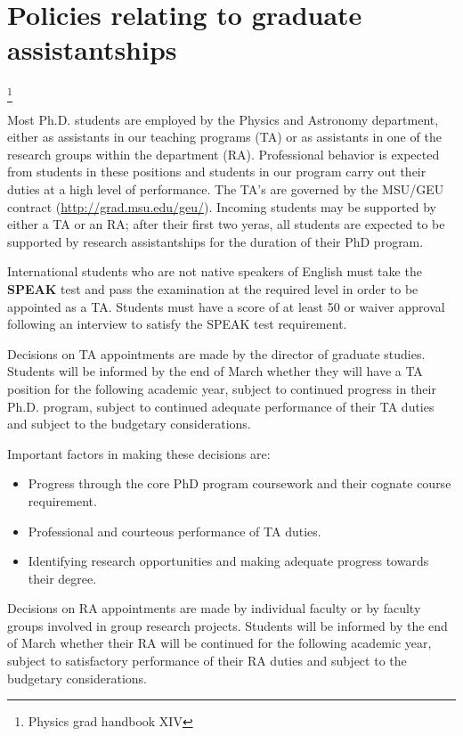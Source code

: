 \section{Policies relating to graduate assistantships}\footnote{Physics grad
  handbook XIV}

Most Ph.D. students are employed by the Physics and Astronomy
department, either as assistants in our teaching programs (TA) or as
assistants in one of the research groups within the department (RA).
Professional behavior is expected from students in these positions and
students in our program carry out their duties at a high level of
performance. The TA's are governed by the MSU/GEU contract
(\url{http://grad.msu.edu/geu/}).  Incoming students may be supported
by either a TA or an RA; after their first two yeras, all students are
expected to be supported by research assistantships for the duration
of their PhD program.

International students who are not native speakers of English must
take the \textbf{SPEAK} test and pass the examination at the required
level in order to be appointed as a TA. Students must have a score of
at least 50 or waiver approval following an interview to satisfy the
SPEAK test requirement.

Decisions on TA appointments are made by the director of graduate
studies.  Students will be informed by the end of March whether they
will have a TA position for the following academic year, subject to
continued progress in their Ph.D. program, subject to continued
adequate performance of their TA duties and subject to the budgetary
considerations.

Important factors in making these decisions are:

\begin{itemize}
\item Progress through the core PhD program coursework and their
cognate course requirement.
\item Professional and courteous performance of TA duties.
\item Identifying research opportunities and making adequate progress
towards their degree.
\end{itemize}

Decisions on RA appointments are made by individual faculty or by
faculty groups involved in group research projects. Students will be
informed by the end of March whether their RA will be continued for
the following academic year, subject to satisfactory performance of
their RA duties and subject to the budgetary considerations.

